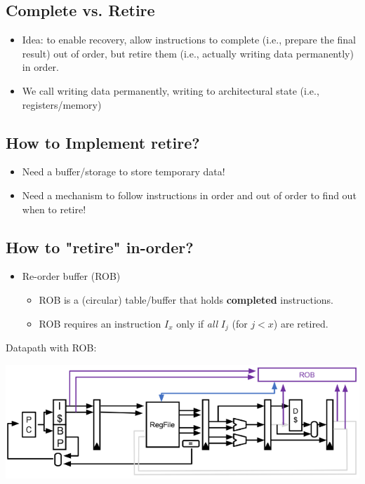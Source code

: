 \documentclass[10pt]{article}
\begin{document}
\subsection*{Complete vs. Retire}
\begin{itemize}
    \item Idea: to enable recovery, allow instructions to complete (i.e., prepare the final result) out of order, but retire them (i.e., actually writing data permanently) in order.
    \item We call writing data permanently, writing to architectural state (i.e., registers/memory)
\end{itemize}

\subsection*{How to Implement retire?}
\begin{itemize}
    \item Need a buffer/storage to store temporary data!
    \item Need a mechanism to follow instructions in order and out of order to find out when to retire!
\end{itemize}

\subsection*{How to "retire" in-order?}
\begin{itemize}
    \item Re-order buffer (ROB)
    \begin{itemize}
        \item ROB is a (circular) table/buffer that holds \textbf{completed} instructions.
        \item ROB requires an instruction $I_x$ only if \textit{all} $I_j$ (for $j < x$) are retired.
    \end{itemize}
\end{itemize}
Datapath with ROB:
\begin{center}
    \includegraphics*[scale=0.8]{W5_2}
\end{center}
\end{document}
